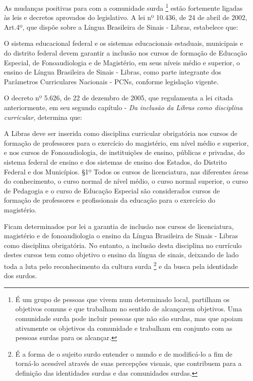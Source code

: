 \documentclass[brasil]{abnt}
\begin{document}
	As mudanças positivas para com a comunidade surda \footnote{É um grupo de pessoas que vivem num determinado local, partilham os objetivos comuns e que trabalham no sentido de alcançarem objetivos. 
	Uma comunidade surda pode incluir pessoas que não são surdas, mas que apoiam ativamente os objetivos da comunidade e trabalham em conjunto com as pessoas surdas para os alcançar.} estão fortemente ligadas 
	às leis e decretos aprovados do legislativo. A lei nº 10.436, de 24 de abril de 2002, Art.4º, que dispõe sobre a Língua Brasileira de Sinais - Libras, estabelece que:
		
			\begin{citacao} O sistema educacional federal e os sistemas educacionais estaduais, municipais e do distrito federal devem garantir a inclusão nos cursos de formação de Educação Especial, de 
							Fonoaudiologia e de Magistério, em seus níveis médio e superior, o ensino de Língua Brasileira de Sinais - Libras, como parte integrante dos Parâmetros Curriculares Nacionais - 
							PCNs, conforme legislação vigente.
			\end{citacao}
		
	O decreto nº 5.626, de 22 de dezembro de 2005, que regulamenta a lei citada anteriormente, em seu segundo capítulo - \textit{Da inclusão da Libras como disciplina curricular}, determina que:
		
			\begin{citacao} A Libras deve ser inserida como disciplina curricular obrigatória nos cursos de formação de professores para o exercício do magistério, em nível médio e superior, e nos cursos de 
							Fonoaudiologia, de instituições de ensino, públicas e privadas, do sistema federal de ensino e dos sistemas de ensino dos Estados, do Distrito Federal e dos Municípios.
							\S 1º Todos os cursos de licenciatura, nas diferentes áreas do conhecimento, o curso normal de nível médio, o curso normal superior, o curso de Pedagogia e o curso de Educação 
							Especial são considerados cursos de formação de professores e profissionais da educação para o exercício do magistério. 
			\end{citacao}
	
	Ficam determinados por lei a garantia de inclusão nos cursos de licenciatura, magistério e de fonoaudiologia o ensino da Língua Brasileira de Sinais - Libras como disciplina obrigatória. No entanto, 
	a inclusão desta disciplina no currículo destes cursos tem como objetivo o ensino da língua de sinais, deixando de lado toda a luta pelo reconhecimento da cultura surda \footnote{É a forma de o sujeito 
	surdo entender o mundo e de modificá-lo a fim de torná-lo acessível através de suas percepções visuais, que contribuem para a definição das identidades surdas e das comunidades surdas.} e da busca 
	pela identidade dos surdos.  
	
\end{document}
